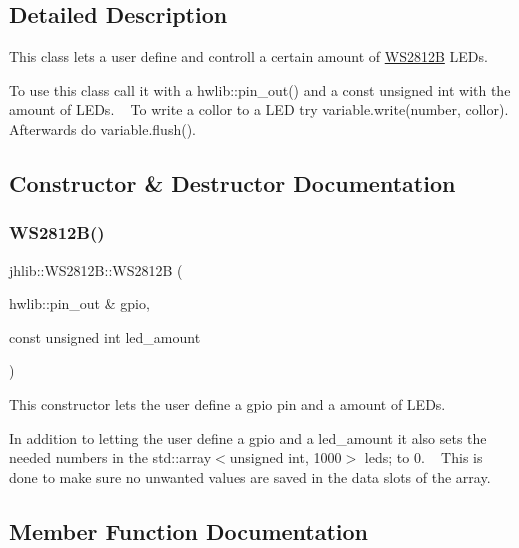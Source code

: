 \subsection{Detailed Description}
This class lets a user define and controll a certain amount of \hyperlink{classjhlib_1_1WS2812B}{W\+S2812B} L\+E\+Ds. 

To use this class call it with a hwlib\+::pin\+\_\+out() and a const unsigned int with the amount of L\+E\+Ds. ~\newline
 To write a collor to a L\+ED try variable.\+write(number, collor). Afterwards do variable.\+flush(). 

\subsection{Constructor \& Destructor Documentation}
\mbox{\label{classjhlib_1_1WS2812B_a421968f5ea0be36b24a1187da4b858db}} 
\subsubsection{\texorpdfstring{W\+S2812\+B()}{WS2812B()}}
{\footnotesize\ttfamily jhlib\+::\+W\+S2812\+B\+::\+W\+S2812B (\begin{DoxyParamCaption}\item[{hwlib\+::pin\+\_\+out \&}]{gpio,  }\item[{const unsigned int}]{led\+\_\+amount }\end{DoxyParamCaption})\hspace{0.3cm}{\ttfamily [inline]}}



This constructor lets the user define a gpio pin and a amount of L\+E\+Ds. 

In addition to letting the user define a gpio and a led\+\_\+amount it also sets the needed numbers in the std\+::array$<$unsigned int, 1000$>$ leds; to 0. ~\newline
 This is done to make sure no unwanted values are saved in the data slots of the array. 

\subsection{Member Function Documentation}
\mbox{\label{classjhlib_1_1WS2812B_a1ee14275e07d0fcd6e19034df0518385}} 
